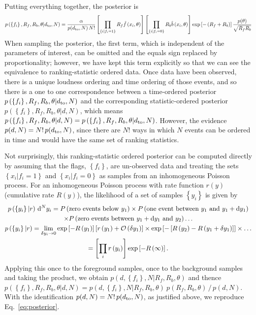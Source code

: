 \documentclass[aps,prd]{revtex4-1}
\newcommand{\order}[1]{\mathcal{O}\left( #1 \right)}
\newcommand{\mathset}[1]{\left\{ #1 \right\}}
\begin{document}
Putting everything together, the posterior is
\begin{equation}
  \label{eq:posterior}
  p\left( \mathset{f_i}, R_f, R_b, \theta | d_{\rm to},N \right) =
  \frac{\alpha}{p(d_{\rm to},N)\,N!} \left[ \prod_{\mathset{i | f_i =
        1}} R_f \hat{f}\left(x_i, \theta\right) \right] \left[
    \prod_{\mathset{i | f_i = 0}} R_b \hat{b}\left( x_i, \theta\right)
    \right] \exp\left[ - \left(R_f + R_b\right) \right]
  \frac{p(\theta)}{\sqrt{R_f R_b}}
\end{equation}
When sampling the posterior, the first term, which is independent of
the parameters of interest, can be omitted and the
equals sign replaced by proportionality; however, we have kept this term explicitly so
that we can see the equivalence to ranking-statistic ordered
data. Once data have been observed, there is a unique loudness
ordering and time ordering of those events, and so there is a one to
one correspondence between a time-ordered posterior $p\left(
\mathset{f_i}, R_f, R_b, \theta | d_{\rm to},N \right)$ and the
corresponding statistic-ordered posterior $ p\left( \mathset{f_i},
R_f, R_b, \theta | d,N \right)$, which means $p\left( \mathset{f_i},
R_f, R_b, \theta | d,N \right) = p\left( \mathset{f_i}, R_f, R_b,
\theta | d_{\rm to},N \right)$. However, the evidence $p(d,N) =
N!\,p(d_{\rm to},N)$, since there are $N!$ ways in which $N$ events
can be ordered in time and would have the same set of ranking
statistics.

Not surprisingly, this ranking-statistic ordered posterior can be
computed directly by assuming that the flags, $\mathset{f_i}$, are
un-observed data and treating the sets $\mathset{x_i | f_i = 1}$ and
$\mathset{x_i | f_i = 0}$ as samples from an inhomogeneous Poisson
process.  For an inhomogeneous Poisson process with rate function
$r(y)$ (cumulative rate $R(y)$), the likelihood of a set of samples
$\mathset{y_i}$ is given by
\begin{multline}
  p\left( \mathset{y_i} | r \right) \,{\rm d}^Ny_i= P\left(
  \textnormal{zero events below } y_1 \right) \times P\left(
  \textnormal{one event between } y_1 \textnormal{ and } y_1 + {\rm
    d}y_1 \right) \\ \times P\left( \textnormal{zero events between }
  y_1+{\rm d}y_1 \textnormal{ and } y_2 \right) \ldots \\ p\left(
  \mathset{y_i} | r \right) = \lim_{\delta y_i \to 0} \exp\left[ -
    R\left(y_1\right) \right] \left[ r\left( y_1 \right) +
    \order{\delta y_1} \right] \times \exp\left[ - \left[ R\left( y_2
      \right) - R\left( y_1 + \delta y_1\right) \right] \right] \times
  \ldots \\ = \left[\prod_i r\left( y_i \right)\right] \exp\left[ -
    R\left( \infty \right) \right].
\end{multline}
Applying this once to the foreground samples, once to the background
samples and taking the product, we obtain $p(d,\mathset{f_i}, N | R_f,
R_b, \theta)$ and thence $p(\mathset{f_i}, R_f, R_b, \theta | d,N) =
p(d,\mathset{f_i}, N | R_f, R_b, \theta)\ p(R_f, R_b,
\theta)\, /\, p(d,N)$. With the identification $p(d,N) = N!\,p(d_{\rm
  to},N)$, as justified above, we reproduce Eq.~\eqref{eq:posterior}.
\end{document}
